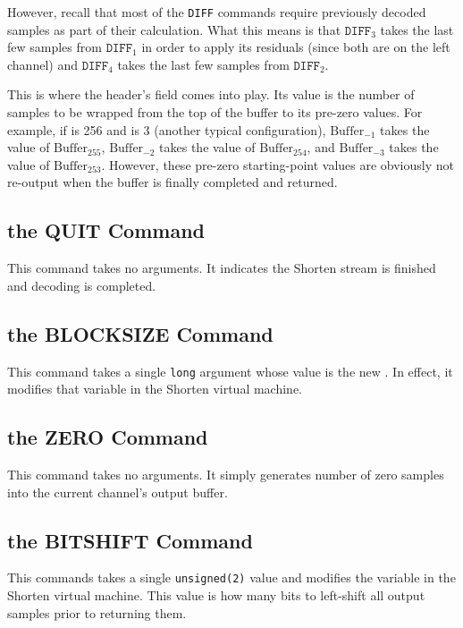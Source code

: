 However, recall that most of the \texttt{DIFF} commands require
previously decoded samples as part of their calculation.
What this means is that $\texttt{DIFF}_3$ takes the last
few samples from $\texttt{DIFF}_1$ in order to apply its residuals
(since both are on the left channel) and $\texttt{DIFF}_4$
takes the last few samples from $\texttt{DIFF}_2$.

This is where the header's  field comes into play.
Its value is the number of samples to be wrapped from the top of the buffer
to its pre-zero values.
For example, if  is 256 and  is 3
(another typical configuration),
$\text{Buffer}_{-1}$ takes the value of $\text{Buffer}_{255}$,
$\text{Buffer}_{-2}$ takes the value of $\text{Buffer}_{254}$, and
$\text{Buffer}_{-3}$ takes the value of $\text{Buffer}_{253}$.
However, these pre-zero starting-point values are obviously not
re-output when the buffer is finally completed and returned.

\subsection{the QUIT Command}

This command takes no arguments.
It indicates the Shorten stream is finished and decoding is completed.

\subsection{the BLOCKSIZE Command}

This command takes a single \texttt{long} argument
whose value is the new .
In effect, it modifies that variable in the Shorten virtual machine.

\subsection{the ZERO Command}

This command takes no arguments.
It simply generates  number of zero samples
into the current channel's output buffer.

\subsection{the BITSHIFT Command}

This commands takes a single \texttt{unsigned(2)} value
and modifies the  variable in the Shorten virtual machine.
This value is how many bits to left-shift all output samples
prior to returning them.

